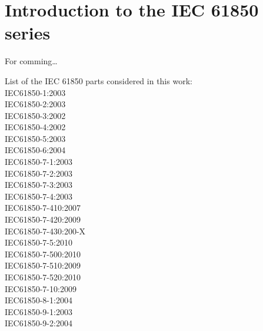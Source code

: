 \chapter{Introduction to the IEC 61850 series}
For comming\ldots  

List of the IEC 61850 parts considered 
in this work:  \\
IEC61850-1:2003 	\cite{IEC61850-1:2003} \\
IEC61850-2:2003		\cite{IEC61850-2:2003} \\
IEC61850-3:2002		\cite{IEC61850-3:2002} \\
IEC61850-4:2002		\cite{IEC61850-4:2002} \\
IEC61850-5:2003		\cite{IEC61850-5:2003} \\
IEC61850-6:2004		\cite{IEC61850-6:2004}  \\
IEC61850-7-1:2003	\cite{IEC61850-7-1:2003} \\
IEC61850-7-2:2003	\cite{IEC61850-7-2:2003} \\
IEC61850-7-3:2003	\cite{IEC61850-7-3:2003} \\
IEC61850-7-4:2003	\cite{IEC61850-7-4:2003} \\
IEC61850-7-410:2007	\cite{IEC61850-7-410:2007} \\
IEC61850-7-420:2009	\cite{IEC61850-7-420:2009} \\
IEC61850-7-430:200-X\cite{IEC61850-7-430:200-X} \\
IEC61850-7-5:2010	\cite{IEC61850-7-5:2010} \\
IEC61850-7-500:2010	\cite{IEC61850-7-500:2010} \\
IEC61850-7-510:2009	\cite{IEC61850-7-510:2009} \\
IEC61850-7-520:2010	\cite{IEC61850-7-520:2010} \\
IEC61850-7-10:2009	\cite{IEC61850-7-10:2009} \\
IEC61850-8-1:2004	\cite{IEC61850-8-1:2004} \\
IEC61850-9-1:2003	\cite{IEC61850-9-1:2003} \\
IEC61850-9-2:2004	\cite{IEC61850-9-2:2004} \\ 

